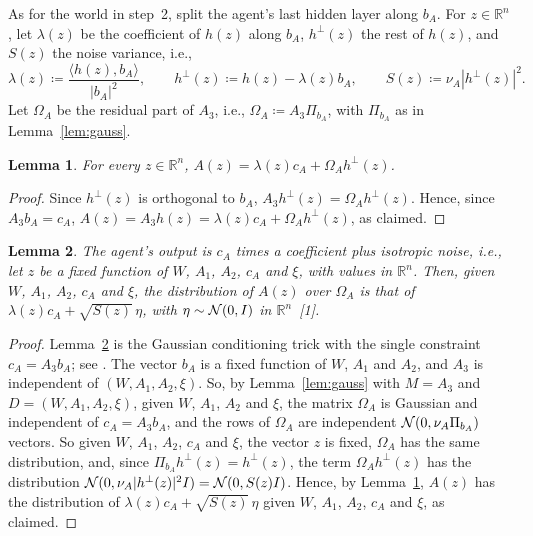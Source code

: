 \documentclass[10pt]{article}
\newcommand{\leanmark}[1]{{\relscale{0.78}\color{gray}[#1]}}
\newenvironment{leanitems}{\par\smallskip\relscale{0.78}\color{gray}\hypersetup{urlcolor=gray}\raggedright%
  \begin{list}{}{\setlength{\leftmargin}{2em}\setlength{\labelwidth}{1.6em}%
  \setlength{\labelsep}{0.4em}\setlength{\itemsep}{0pt}\setlength{\topsep}{0pt}%
  \setlength{\parsep}{0pt}}}{\end{list}\par\medskip}
\newtheorem{lemma}{Lemma}
\newcommand{\RR}{\mathbb{R}}
\begin{document}
\begin{enumerate}[leftmargin=*,itemsep=8pt,topsep=10pt plus 2pt]
  As for the world in step~2, split the agent's last hidden layer along
  $b_A$. For $z\in\RR^n$, let
  $\lambda(z)$ be the coefficient of $h(z)$ along $b_A$, $h^\perp(z)$ the rest
  of $h(z)$, and $S(z)$ the noise variance, i.e.,
  \[\lambda(z)\coloneqq \frac{\langle h(z),b_A\rangle}{|b_A|^2},\qquad
  h^\perp(z)\coloneqq h(z)-\lambda(z)b_A,\qquad
  S(z)\coloneqq \nu_A|h^\perp(z)|^2.\]
  Let $\Omega_A$ be the residual part of $A_3$,
  i.e., $\Omega_A\coloneqq A_3\Pi_{b_A}$, with $\Pi_{b_A}$ as in
  Lemma~\ref{lem:gauss}.
  \begin{lemma}\label{lem:asplit}
    For every $z\in\RR^n$, $A(z)=\lambda(z)c_A+\Omega_Ah^\perp(z)$.
  \end{lemma}
  \begin{proof}
  Since $h^\perp(z)$ is orthogonal to $b_A$,
  $A_3h^\perp(z)=\Omega_Ah^\perp(z)$. Hence, since $A_3b_A=c_A$,
  $A(z)=A_3h(z)=\lambda(z)c_A+\Omega_Ah^\perp(z)$, as claimed.
  \end{proof}
  \begin{lemma}\label{lem:agentout}
    The agent's output is $c_A$ times a coefficient plus isotropic
    noise, i.e., let $z$ be a fixed function of $W$, $A_1$, $A_2$, $c_A$ and
    $\xi$, with values in $\RR^n$. Then, given $W$, $A_1$, $A_2$, $c_A$ and
    $\xi$, the distribution of $A(z)$ over $\Omega_A$ is that of
    $\lambda(z)c_A+\sqrt{S(z)}\,\eta$, with $\eta\sim\mathcal{N}(0,I)$ in
    $\RR^n$~\leanmark{1}.
  \end{lemma}
  \begin{proof}
  Lemma~\ref{lem:agentout} is the Gaussian conditioning trick with the single
  constraint $c_A=A_3b_A$; see \citet[arXiv v3, Lemma~G.7]{yang-2019-tp1}. The vector $b_A$ is a fixed function of $W$, $A_1$ and $A_2$, and
  $A_3$ is independent of $(W,A_1,A_2,\xi)$. So, by Lemma~\ref{lem:gauss}
  with $M=A_3$ and $D=(W,A_1,A_2,\xi)$, given $W$, $A_1$, $A_2$ and $\xi$,
  the matrix $\Omega_A$ is Gaussian and independent of $c_A=A_3b_A$, and the
  rows of $\Omega_A$ are independent $\mathcal{N}(0,\nu_A\Pi_{b_A})$ vectors. So
  given $W$, $A_1$, $A_2$, $c_A$ and $\xi$, the vector $z$ is fixed,
  $\Omega_A$ has the same distribution, and, since
  $\Pi_{b_A}h^\perp(z)=h^\perp(z)$, the term $\Omega_Ah^\perp(z)$ has the
  distribution $\mathcal{N}(0,\nu_A|h^\perp(z)|^2I)=\mathcal{N}(0,S(z)I)$. Hence, by
  Lemma~\ref{lem:asplit}, $A(z)$ has the distribution
  of $\lambda(z)c_A+\sqrt{S(z)}\,\eta$ given $W$, $A_1$, $A_2$, $c_A$ and $\xi$, as claimed.
  \end{proof}
  \begin{leanitems}

\end{leanitems}
\end{enumerate}
\end{document}
